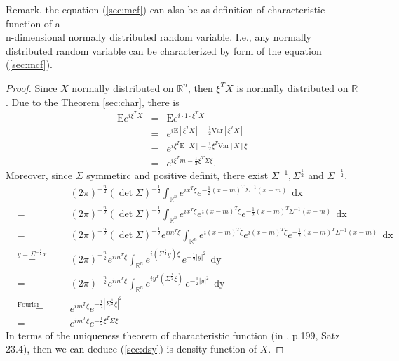 \documentclass[a4paper, twoside, 11pt]{article}
\theoremstyle{definition}
\newcommand{\sqbr}[1]{\left[ {#1} \right]}
\begin{document}
Remark, the equation (\ref{sec:mcf}) can also be as definition of characteristic function of a \\n-dimensional normally distributed random variable. I.e., any normally distributed random variable can be characterized by form of the equation (\ref{sec:mcf}).

\begin{proof}
  Since $X$ normally distributed on $\mathbb{R}^{n}$, then $\xi^T X$ is normally distributed on $\mathbb{R}$. Due to the Theorem \ref{sec:char}, there is
  \begin{eqnarray*}
	\mathrm{E} e^{i\xi^T X} &=& \mathrm{E} e^{i\cdot 1 \cdot \xi^T X}\\
	                        &=& e^{i\mathrm{E}\sqbr{\xi^T X} -\frac{1}{2}\mathrm{Var}\sqbr{\xi^T X}}\\
							&=& e^{i\xi^T\mathrm{E}\sqbr{X} - \frac{1}{2}\xi^T \mathrm{Var}\sqbr{X} \xi}\\
						    &=& e^{i\xi^Tm - \frac{1}{2}\xi^T \Sigma \xi}.
  \end{eqnarray*}
  Moreover, since $\Sigma$ symmetirc and positive definit, there exist $\Sigma^{-1}, \Sigma^{\frac{1}{2}}$ and $\Sigma^{-\frac{1}{2}}$.
  \begin{eqnarray*}
	&&(2\pi)^{-\frac{n}{2}} (\det\Sigma) ^{-\frac{1}{2}}\int_{\mathbb{R}^{n}} e^{i x^T \xi}e^{-\frac{1}{2}(x-m)^T\Sigma^{-1}(x-m)}\, \mathop{dx}\\
	&=& (2\pi)^{-\frac{n}{2}} (\det\Sigma) ^{-\frac{1}{2}}\int_{\mathbb{R}^{n}} e^{ix^T\xi} e^{i (x-m)^T \xi}e^{-\frac{1}{2}(x-m)^T\Sigma^{-1}(x-m)}\, \mathop{dx} \\
	&=& (2\pi)^{-\frac{n}{2}} (\det\Sigma) ^{-\frac{1}{2}}  e^{im^T\xi} \int_{\mathbb{R}^{n}} e^{i(x-m)^T\xi} e^{i (x-m)^T \xi}e^{-\frac{1}{2}(x-m)^T\Sigma^{-1}(x-m)}\, \mathop{dx} \\
	&\overset{y=\Sigma^{-\frac{1}{2}}x}{=}& (2\pi)^{-\frac{n}{2}} e^{im^T\xi} \int_{\mathbb{R}^{n}}e^{i (\Sigma^{\frac{1}{2}}y) \xi}\,e^{-\frac{1}{2}|y|^2}\, \mathop{dy}\\
	&=& (2\pi)^{-\frac{n}{2}} e^{im^T\xi}  \int_{\mathbb{R}^{n}}e^{i y^T (\Sigma^{\frac{1}{2}}\xi)}\,e^{-\frac{1}{2}|y|^2}\, \mathop{dy}\\
	&\overset{\text{Fourier transformation}}{=}& e^{im^T\xi}  e^{-\frac{1}{2}|\Sigma^{\frac{1}{2}}\xi|^2}\\
	&=& e^{im^T\xi}  e^{-\frac{1}{2}\xi^T\Sigma\xi}
  \end{eqnarray*}
  In terms of the uniqueness theorem of characteristic function (in \cite{bauer}, p.199, Satz 23.4), then we can deduce (\ref{sec:dsy}) is density function of $X$.
\end{proof}
\end{document}
